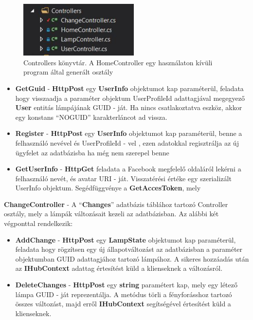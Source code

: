 \documentclass[a4paper,12pt]{report}
\begin{document}
\begin{figure}[H]
    \centering
    \includegraphics[width=6cm,keepaspectratio]{images/servicecontrollers.jpg}
    \caption{Controllers könyvtár. A HomeController egy használaton kívüli program által generált osztály}
    \label{fig: ControllersPackage}
\end{figure}

 \begin{itemize}
     \item \textbf{GetGuid} - \textbf{HttpPost} egy \textbf{UserInfo} objektumot kap paraméterül, feladata hogy visszaadja a paraméter
     objektum UserProfileId adattagjával megegyező \textbf{User} entitás lámpájának GUID - ját. Ha nincs csatlakoztatva eszköz,
     akkor egy konstans ``NOGUID'' karakterláncot ad vissza.
     \item \textbf{Register} - \textbf{HttpPost} egy \textbf{UserInfo} objektumot kap paraméterül, benne a felhasználó nevével és UserProfileId - vel
     , ezen adatokkal regisztrálja az új ügyfelet az adatbázisba ha még nem szerepel benne
     \item \textbf{GetUserInfo} - \textbf{HttpGet} feladata a Facebook megfelelő oldaláról lekérni a felhasználó nevét, és avatar URI - ját.
     Visszatérési értéke egy szerializált UserInfo objektum. Segédfüggvénye a \textbf{GetAccesToken}, mely
 \end{itemize}

    \textbf{ChangeController} - A ``\textbf{Changes}'' adatbázis táblához tartozó Controller osztály, mely a lámpák változásait kezeli az adatbázisban.
    Az alábbi két végponttal rendelkezik:

 \begin{itemize}
     \item \textbf{AddChange} - \textbf{HttpPost} egy \textbf{LampState} objektumot kap paraméterül, feladata hogy rögzítsen egy új állapotváltozást
     az adatbázisban a paraméter objektumban GUID adattagjához tartozó lámpához. A sikeres hozzáadás után az \textbf{IHubContext} adattag értesítést
     küld a klienseknek a változásról.
     \item \textbf{DeleteChanges} - \textbf{HttpPost} egy \textbf{string} paramétert kap, mely egy létező lámpa GUID - ját reprezentálja. A metódus
     törli a fényforásshoz tartozó összes változást, majd erről \textbf{IHubContext} segítségével értesítést küld a klienseknek.
 \end{itemize}
\end{document}
